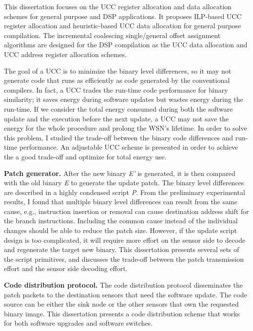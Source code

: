 This dissertation focuses on the UCC register allocation and data allocation schemes for general purpose and DSP 
applications.
It proposes ILP-based UCC register allocation and heuristic-based UCC data allocation for general purpose compilation.
The incremental coalescing single/general offset assignment algorithms are designed for the DSP compilation as the UCC 
data allocation and UCC address register allocation schemes.

The goal of a UCC is to minimize the binary level differences, so it may not generate code that runs as efficiently as 
code generated by the conventional compilers.
In fact, a UCC trades the run-time code performance for binary similarity; it saves energy during software updates but 
wastes energy during the run-time.
If we consider the total energy consumed during both the software update and the execution before the next update, a 
UCC may not save the energy for the whole procedure and prolong the WSN's lifetime.
In order to solve this problem, I studied the trade-off between the binary code differences and run-time performance. 
An adjustable UCC scheme is presented in order to achieve the a good trade-off and optimize for total energy use.
	
\textbf{Patch generator.}
After the new binary {\it E'} is generated, it is then compared with the old binary {\it E} to generate the update 
patch. The binary level differences are described in a highly condensed script {\it P}. 
From the preliminary experimental results, I found that multiple binary level differences can result from the same 
cause, e.g., instruction insertion or removal can cause destination address shift for the branch instructions.
Including the common cause instead of the individual changes should be able to reduce the patch size.
However, if the update script design is too complicated, it will require more effort on the sensor side to decode and 
regenerate the target new binary.
This dissertation presents several sets of the script primitives, and discusses the trade-off between the patch 
transmission effort and the sensor side decoding effort.


\textbf{Code distribution protocol.}
The code distribution protocol disseminates the patch packets to the destination sensors that need the software update. 
The code source can be either the sink node or the other sensors that own the requested binary image.
This dissertation presents 
a code distribution scheme that works for both software upgrades and software switches.

